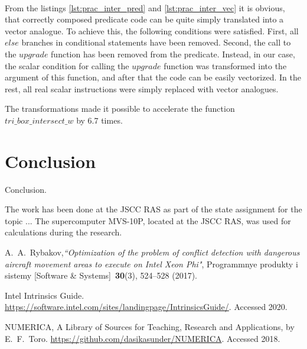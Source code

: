 \documentclass[
11pt,%
tightenlines,%
twoside,%
onecolumn,%
nofloats,%
nobibnotes,%
nofootinbib,%
superscriptaddress,%
noshowpacs,%
centertags]%
{revtex4}
\begin{document}
\ \\

From the listings \ref{lst:prac_inter_pred} and \ref{lst:prac_inter_vec} it is obvious, that correctly composed predicate code can be quite simply translated into a vector analogue.
To achieve this, the following conditions were satisfied.
First, all $else$ branches in conditional statements have been removed.
Second, the call to the $upgrade$ function has been removed from the predicate.
Instead, in our case, the scalar condition for calling the $upgrade$ function was transformed into the argument of this function, and after that the code can be easily vectorized.
In the rest, all real scalar instructions were simply replaced with vector analogues.

The transformations made it possible to accelerate the function \\
$tri\_box\_intersect\_w$ by 6.7 times.

\section{Conclusion}

Conclusion.

\begin{acknowledgments}
The work has been done at the JSCC RAS as part of the state assignment for the topic ... The supercomputer MVS-10P, located at the JSCC RAS, was used for calculations during the research.
\end{acknowledgments}

\begin{thebibliography}{99}

A.~A.~Rybakov,{\it ``Optimization of the problem of conflict detection with dangerous aircraft movement areas to execute on Intel Xeon Phi"}, Programmnye produkty i sistemy [Software \& Systems]~{\bf 30}(3), 524--528 (2017).

Intel Intrinsics Guide. \url{https://software.intel.com/sites/landingpage/IntrinsicsGuide/}. Accessed 2020.

NUMERICA, A Library of Sources for Teaching, Research and Applications, by E.~F.~Toro. \url{https://github.com/dasikasunder/NUMERICA}. Accessed 2018.

\end{thebibliography}
\end{document}
